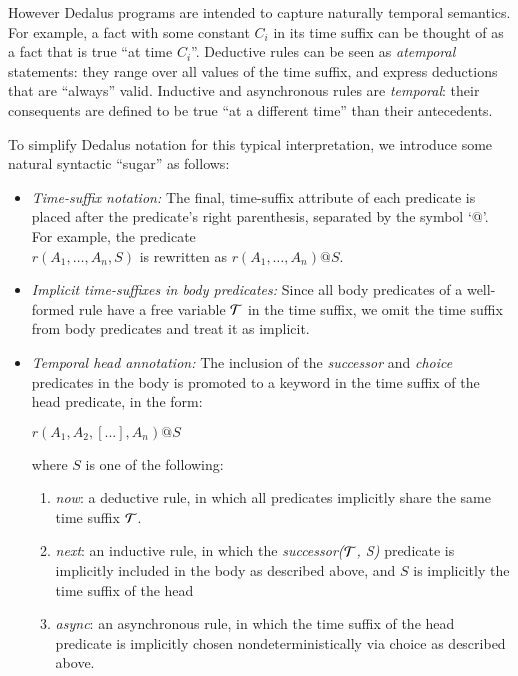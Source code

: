However Dedalus programs are intended to capture naturally temporal semantics.  For example, a fact with some constant $C_i$ in its time suffix can be thought of as a fact that is true ``at time $C_i$''.  Deductive rules can be seen as {\em atemporal} statements: they range over all values of the time suffix, and express deductions that are ``always'' valid.
Inductive and asynchronous rules are {\em temporal}:
their consequents are defined to be true ``at a different time'' than their antecedents. 

To simplify Dedalus notation for this typical interpretation,  we introduce some natural syntactic ``sugar'' as follows:  

\begin{itemize}
	\item {\em Time-suffix notation:}  The final, time-suffix attribute of each predicate is placed after the predicate's right parenthesis, separated by the symbol `@'.   For example, the predicate \\
	$r(A_{1}, \ldots, A_{n}, S)$ is rewritten as $r(A_{1}, \ldots, A_{n})@S$.
	\item {\em Implicit time-suffixes in body predicates:} Since all body predicates of a well-formed rule have a free variable $\Tau$ in the time suffix, we omit the time suffix from body predicates and treat it as implicit. 
	\item {\em Temporal head annotation:} The inclusion of the \emph{successor}
and \emph{choice} predicates in the body is promoted to a keyword in the time suffix of the head predicate, in the form:

$r(A_{1},A_{2},[...],A_{n})@S$

where $S$ is one of the following:
\begin{enumerate}
\item \emph{now}: a deductive rule, in which all predicates implicitly share the same time suffix $\Tau$.
\item \emph{next}: an inductive rule, in which the \emph{successor($\Tau$, S)} predicate is implicitly included in the body as described above, and $S$ is implicitly the time suffix of the head
\item \emph{async}: an asynchronous rule, in which the time suffix of the head predicate is implicitly chosen nondeterministically via choice as described above.
\end{enumerate}
\end{itemize}

% 
% 


